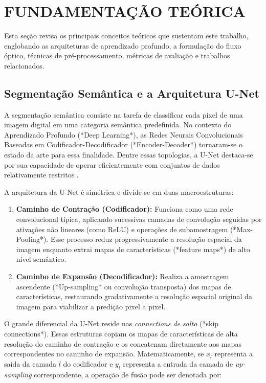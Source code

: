 \chapter{FUNDAMENTAÇÃO TEÓRICA}
\label{cap:fundamentacao_teorica}

Esta seção revisa os principais conceitos teóricos que sustentam este trabalho, englobando as arquiteturas de aprendizado profundo, a formulação do fluxo óptico, técnicas de pré-processamento, métricas de avaliação e trabalhos relacionados.

\section{Segmentação Semântica e a Arquitetura U-Net}
\label{sec:unet}

A segmentação semântica consiste na tarefa de classificar cada pixel de uma imagem digital em uma categoria semântica predefinida. No contexto do Aprendizado Profundo (*Deep Learning*), as Redes Neurais Convolucionais Baseadas em Codificador-Decodificador (*Encoder-Decoder*) tornaram-se o estado da arte para essa finalidade. Dentre essas topologias, a U-Net destaca-se por sua capacidade de operar eficientemente com conjuntos de dados relativamente restritos \cite{ronneberger2015unet}.

A arquitetura da U-Net é simétrica e divide-se em duas macroestruturas:
\begin{enumerate}
    \item \textbf{Caminho de Contração (Codificador):} Funciona como uma rede convolucional típica, aplicando sucessivas camadas de convolução seguidas por ativações não lineares (como ReLU) e operações de subamostragem (*Max-Pooling*). Esse processo reduz progressivamente a resolução espacial da imagem enquanto extrai mapas de características (*feature maps*) de alto nível semântico.
    \item \textbf{Caminho de Expansão (Decodificador):} Realiza a amostragem ascendente (*Up-sampling* ou convolução transposta) dos mapas de características, restaurando gradativamente a resolução espacial original da imagem para viabilizar a predição pixel a pixel.
\end{enumerate}

O grande diferencial da U-Net reside nas \textit{connections de salto} (*skip connections*). Essas estruturas copiam os mapas de características de alta resolução do caminho de contração e os concatenam diretamente aos mapas correspondentes no caminho de expansão. Matematicamente, se $x_l$ representa a saída da camada $l$ do codificador e $y_l$ representa a entrada da camada de \textit{up-sampling} correspondente, a operação de fusão pode ser denotada por:

